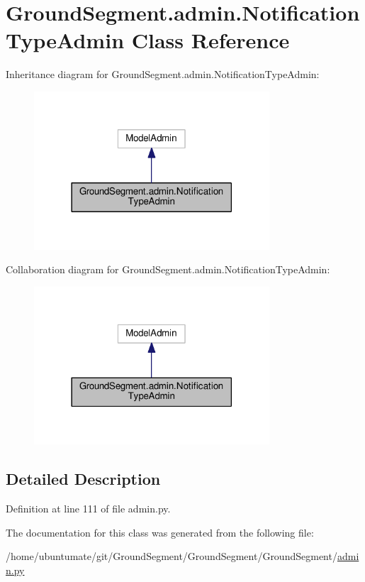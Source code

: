 \hypertarget{class_ground_segment_1_1admin_1_1_notification_type_admin}{}\section{Ground\+Segment.\+admin.\+Notification\+Type\+Admin Class Reference}
\label{class_ground_segment_1_1admin_1_1_notification_type_admin}


Inheritance diagram for Ground\+Segment.\+admin.\+Notification\+Type\+Admin\+:\nopagebreak
\begin{figure}[H]
\begin{center}
\leavevmode
\includegraphics[width=249pt]{class_ground_segment_1_1admin_1_1_notification_type_admin__inherit__graph}
\end{center}
\end{figure}


Collaboration diagram for Ground\+Segment.\+admin.\+Notification\+Type\+Admin\+:\nopagebreak
\begin{figure}[H]
\begin{center}
\leavevmode
\includegraphics[width=249pt]{class_ground_segment_1_1admin_1_1_notification_type_admin__coll__graph}
\end{center}
\end{figure}


\subsection{Detailed Description}


Definition at line 111 of file admin.\+py.



The documentation for this class was generated from the following file\+:\begin{DoxyCompactItemize}
\item 
/home/ubuntumate/git/\+Ground\+Segment/\+Ground\+Segment/\+Ground\+Segment/\hyperlink{admin_8py}{admin.\+py}\end{DoxyCompactItemize}
